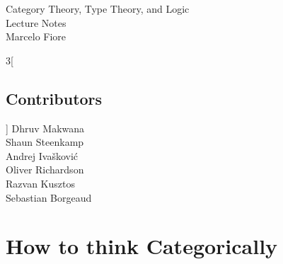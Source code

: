 \newcommand {\cat}{%
    \mathbf%
}
\newcommand {\domain}[1] {%
    \mathrm{dom}(#1)%
}
\newcommand {\codomain}[1] {%
    \mathrm{cod}(#1)%
}
\newcommand {\idarrow}[1][] {%
    \mathbf{1}{#1}%
}
\newcommand {\Cat}{%
    \cat {Cat}%
}
\newcommand {\Mon}{%
    \cat {Mon}%
}
\newcommand {\Poset}{%
    \cat {Poset}%
}
\newcommand {\Rel}{%
    \cat {Rel}%
}
\newcommand {\Sets}{%
    \cat {Sets}%
}
\newcommand {\Groups}{%
    \cat {Groups}%
}
\newcommand {\Graphs}{%
    \cat {Graphs}%
}

\newcommand{\ie}{\emph{i.e.}}
\newcommand{\etc}{\emph{etc.}}

\newcommand{\eqdef}{\stackrel{\text{def}}{=}} %
\newcommand{\comp}{\circ} %
\newcommand{\icomp}{\,} %

\newcommand{\setof}[1]{ \{ #1 \} }
\newcommand{\bigsetof}[1]{ \big\{ #1 \big\} }
\newcommand{\suchthat}{\mid}
\newcommand{\union}{\cup}

\newcommand{\nelem}[1]{ \mathbf{ #1 } }
\newcommand{\id}[1]{ \mathrm{id}_{ #1 } }
\newcommand{\nats}{\mathbb{N}}



\begin{center} {\LARGE \sc
Category Theory, Type Theory, and Logic\\
  Lecture Notes\\[4mm]}
  \Large Marcelo Fiore
\end{center}


\begin{multicols}{3}[\section*{Contributors}]
Dhruv Makwana\\
Shaun Steenkamp\\
Andrej Ivašković\\
Oliver Richardson\\
Razvan Kusztos\\
Sebastian Borgeaud\\
\end{multicols}
\clearpage


\tableofcontents

\newpage
\chapter{How to think Categorically}

